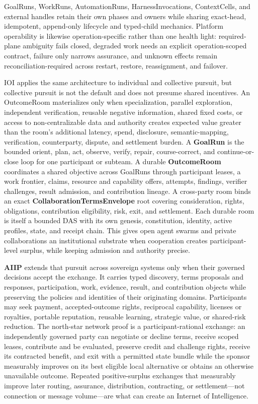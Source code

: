 \documentclass[
  11pt,
]{article}
\begin{document}
GoalRuns, WorkRuns, AutomationRuns, HarnessInvocations, ContextCells, and
external handles retain their own phases and owners while sharing exact-head,
idempotent, append-only lifecycle and typed-child mechanics. Platform
operability is likewise operation-specific rather than one health light:
required-plane ambiguity fails closed, degraded work needs an explicit
operation-scoped contract, failure only narrows assurance, and unknown effects
remain reconciliation-required across restart, restore, reassignment, and
failover.

IOI applies the same architecture to individual and collective pursuit, but
collective pursuit is not the default and does not presume shared incentives.
An OutcomeRoom materializes only when specialization, parallel exploration,
independent verification, reusable negative information, shared fixed costs, or
access to non-centralizable data and authority creates expected value greater
than the room's additional latency, spend, disclosure, semantic-mapping,
verification, counterparty, dispute, and settlement burden. A
\textbf{GoalRun} is the bounded orient, plan, act, observe, verify, repair,
course-correct, and continue-or-close loop for one participant or subteam. A
durable \textbf{OutcomeRoom} coordinates a shared objective across GoalRuns
through participant leases, a work frontier, claims, resource and capability
offers, attempts, findings, verifier challenges, result admission, and
contribution lineage. A cross-party room binds an exact
\textbf{CollaborationTermsEnvelope} root covering consideration, rights,
obligations, contribution eligibility, risk, exit, and settlement. Each durable
room is itself a bounded DAS with its own
genesis, constitution, identity, active profiles, state, and receipt chain.
This gives open agent swarms and private collaborations an institutional
substrate when cooperation creates participant-level surplus, while keeping
admission and authority precise.

\textbf{AIIP} extends that pursuit across sovereign systems only when their
governed decisions accept the exchange. It carries typed discovery, terms
proposals and responses, participation, work, evidence, result, and contribution
objects while preserving the policies and identities of their originating
domains. Participants may seek payment, accepted-outcome rights, reciprocal
capability, licenses or royalties, portable reputation, reusable learning,
strategic value, or shared-risk reduction. The north-star network proof is a
participant-rational exchange: an independently governed party can negotiate or
decline terms, receive scoped leases, contribute and be evaluated, preserve
credit and challenge rights, receive its contracted benefit, and exit with a
permitted state bundle while the sponsor measurably improves on its best
eligible local alternative or obtains an otherwise unavailable outcome.
Repeated positive-surplus exchanges that measurably improve later routing,
assurance, distribution, contracting, or settlement---not connection or
message volume---are what can create an Internet of Intelligence.
\end{document}
